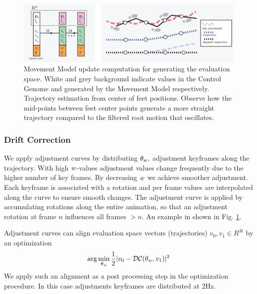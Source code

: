 \begin{figure}
    \centering
    \includegraphics[width=1\columnwidth]{img/trajectory.png}
    \caption{Movement Model update computation for generating the evaluation space. White and grey background indicate values in the Control Genome and generated by the Movement Model respectively.  Trajectory estimation from center of feet positions. Observe how the mid-points between feet center points generate a more straight trajectory compared to the filtered root motion that oscillates.}
    \label{fig:method:trajectory}
\end{figure}

\subsubsection{\bf Drift Correction} 
We apply adjustment curves by distributing $\theta_{w},$ adjustment keyframes along the trajectory. With high ${w}$-values  adjustment values change frequently due to the higher number of key frames. By decreasing ${w}$ we achieve smoother adjustment. Each keyframe is associated with a rotation and per frame values are interpolated along the curve to ensure smooth changes. The adjustment curve is applied by accumulating rotations along the entire animation, so that an adjustment rotation at frame $n$ influences all frames $>n$. An example in shown in Fig. \ref{fig:method:trajectory}. 

Adjustment curves can align evaluation space vectors (trajectories) $v_0,v_1\in R^{3t}$ by an optimization
\begin{subequations}
\begin{align}
    \arg\min_{\theta_{w}}{
        \frac{1}{2}|v_0-\mathcal{DC}(\theta_{w},v_1)|^2
    }
\end{align}
\end{subequations}
We apply such an alignment as a post processing step in the optimization procedure. In this case adjustments keyframes are distributed at 2Hz. 

